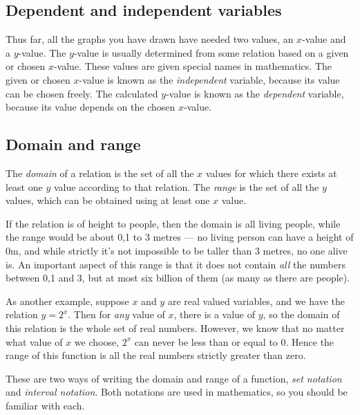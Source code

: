 \label{m39337*uid40}
\subsection*{ Dependent and independent variables}
\nopagebreak
\label{m39337*id235764}Thus far, all the graphs you have drawn have needed two values, an $x$-value and a $y$-value. The $y$-value is usually determined from some relation based on a given or chosen $x$-value. These values are given special names in mathematics. The given or chosen $x$-value is known as the \textsl{independent} variable, because its value can be chosen freely. The calculated $y$-value is known as the \textsl{dependent} variable, because its value depends on the chosen $x$-value.\par 
\label{m39337*uid41}
\subsection*{ Domain and range}
\nopagebreak
\label{m39337*id235855}The \textsl{domain} of a relation is the set of all the $x$ values for which there exists at least one $y$ value according to that relation. The \textsl{range} is the set of all the $y$ values, which can be obtained using at least one $x$ value.\par 
\label{m39337*id235908}If the relation is of height to people, then the domain is all living people, while the range would be about 0,1 to 3 metres --- no living person can have a height of 0m, and while strictly it's not impossible to be taller than 3 metres, no one alive is. An important aspect of this range is that it does not contain \textsl{all} the numbers between 0,1 and 3, but at most six billion of them (as many as there are people).\par 
\label{m39337*id235939}As another example, suppose $x$ and $y$ are real valued variables, and we have the relation $y={2}^{x}$. Then for \textsl{any} value of $x$, there is a value of $y$, so the domain of this relation is the whole set of real numbers. However, we know that no matter what value of $x$ we choose, ${2}^{x}$ can never be less than or equal to 0. Hence the range of this function is all the real numbers strictly greater than zero.\par 
\label{m39337*id236030}These are two ways of writing the domain and range of a function, \textsl{set notation} and \textsl{interval notation}. Both notations are used in mathematics, so you should be familiar with each.\par 
\label{m39337*uid42}
